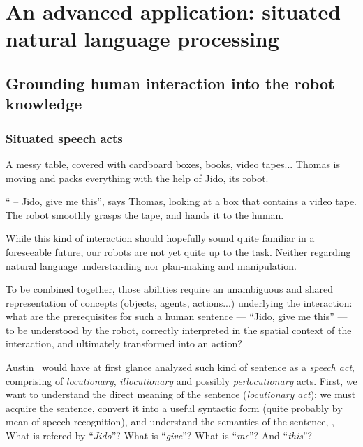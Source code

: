 \chapter{An advanced application: situated natural language processing}
\label{chapt|dialogs}



\section{Grounding human interaction into the robot knowledge}
\label{sect|dialogs}

\subsection{Situated speech acts}
\label{intro_example}

A messy table, covered with cardboard boxes, books, video tapes... Thomas is
moving and packs everything with the help of Jido, its robot.

`` -- Jido, give me this'', says Thomas, looking at a box that contains a video
tape. The robot smoothly grasps the tape, and hands it to the human.

While this kind of interaction should hopefully sound quite familiar in a
foreseeable future, our robots are not yet quite up to the task. Neither
regarding natural language understanding nor plan-making and manipulation.

To be combined together, those abilities require an unambiguous and shared
representation of concepts (objects, agents, actions...) underlying the
interaction: what are the prerequisites for such a
human sentence --- ``Jido, give me this'' --- to be understood by the robot,
correctly interpreted in the spatial context of the interaction, and ultimately
transformed into an action?

Austin~\cite{Austin1962} would have at first glance analyzed such kind of
sentence as a \emph{speech act}, comprising of \emph{locutionary},
\emph{illocutionary} and possibly \emph{perlocutionary} acts. First, we want to
understand the direct meaning of the sentence (\emph{locutionary act}): we must
acquire the sentence, convert it into a useful syntactic form (quite probably
by mean of speech recognition), and understand the semantics of the sentence,
\ie, What is refered by ``\textit{Jido}''? What is ``\textit{give}''? What is
``\textit{me}''? And ``\textit{this}''?

